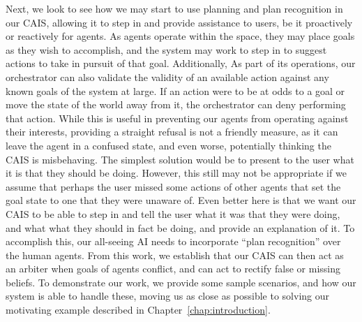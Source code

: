 Next, we look to see how we may start to use planning and plan recognition
in our CAIS, allowing it to step in and provide assistance to users, be it
proactively or reactively for agents. As agents operate within the
space, they may place goals as they wish to accomplish, and the system
may work to step in to suggest actions to take in pursuit of that goal.
Additionally,  As part of its operations, our orchestrator can also
validate the validity of an available action against any known goals of
the system at large. If an action were to be at odds to
a goal or move the state of the world away from it, the orchestrator can
deny performing that action. While this is useful in preventing our agents
from operating against their interests, providing a straight refusal is not
a friendly measure, as it can leave the agent in a confused state, and even
worse, potentially thinking the CAIS is misbehaving. The simplest solution
would be to present to the user what it is that they should be doing. However,
this still may not be appropriate if we assume that perhaps the user missed
some actions of other agents that set the goal state to one that they were
unaware of. Even better here is that we want our CAIS to be able to step in
and tell the user what it was that they were doing, and what what they
should in fact be doing, and provide an explanation of it. To accomplish this,
our all-seeing AI needs to incorporate ``plan recognition'' over the
human agents. From this work, we establish that our CAIS can then act as
an arbiter when goals of agents conflict, and can act to rectify false or
missing beliefs. To demonstrate our work, we provide some sample scenarios,
and how our system is able to handle these, moving us as close as possible to
solving our motivating example described in Chapter~\ref{chap:introduction}.
